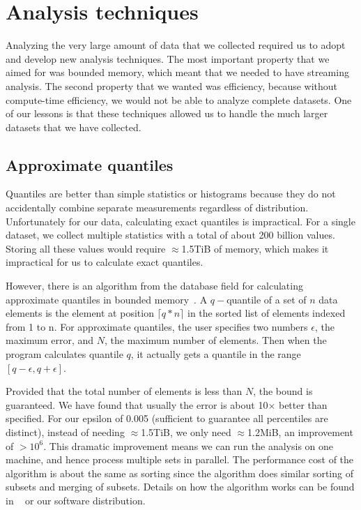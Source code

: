 \section{Analysis techniques}
\label{sec:analysis-techniques}

Analyzing the very large amount of data that we collected required
us to adopt and develop new analysis techniques.
The most important property that we aimed for was bounded memory,
which meant that we needed to have streaming analysis.  The second
property that we wanted was efficiency, because without compute-time efficiency, we
would not be able to analyze complete datasets.  One of our lessons is
that these techniques allowed us to handle the much larger datasets that
we have collected.

\subsection{Approximate quantiles}


Quantiles are better than simple statistics or histograms because they
do not accidentally combine separate measurements regardless of
distribution.  Unfortunately for our data, calculating exact quantiles
is impractical.  For a single dataset, we collect multiple statistics
with a total of about 200 billion values.  Storing all these values
would require $\approx$1.5TiB of memory, which makes it impractical
for us to calculate exact quantiles.

However, there is an algorithm from the database field for calculating
approximate quantiles in bounded
memory~\cite{Manku98approximatemedians}.  A $q-$quantile of a set of
$n$ data elements is the element at position $\lceil q*n\rceil$ in the
sorted list of elements indexed from 1 to n.  For approximate
quantiles, the user specifies two numbers $\epsilon$, the maximum
error, and $N$, the maximum number of elements.  Then when the program
calculates quantile $q$, it actually gets a quantile in the range
$[q-\epsilon,q+\epsilon]$.  

Provided that the total number of elements
is less than $N$, the bound is guaranteed.  We have found that
usually the error is about 10$\times$ better than specified.  For our
epsilon of 0.005 (sufficient to guarantee all percentiles are
distinct), instead of needing $\approx$1.5TiB, we only need
$\approx$1.2MiB, an improvement of $>10^6$.  This dramatic improvement
means we can run the analysis on one machine, and hence process
multiple sets in parallel.  The performance cost of the algorithm is
about the same as sorting since the algorithm does similar sorting of
subsets and merging of subsets.  Details on how the algorithm works
can be found in ~\cite{Manku98approximatemedians} or our software
distribution.

